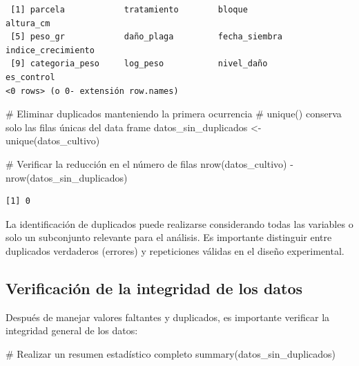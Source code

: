 \documentclass[
  spanish,
  a4paper,
  DIV=11,
  numbers=noendperiod,
  onepage,
  openany]{scrreprt}
\newenvironment{Shaded}{\begin{snugshade}}{\end{snugshade}}
\newcommand{\CommentTok}[1]{\textcolor[rgb]{0.37,0.37,0.37}{#1}}
\newcommand{\FunctionTok}[1]{\textcolor[rgb]{0.28,0.35,0.67}{#1}}
\newcommand{\NormalTok}[1]{\textcolor[rgb]{0.00,0.23,0.31}{#1}}
\newcommand{\OtherTok}[1]{\textcolor[rgb]{0.00,0.23,0.31}{#1}}
\newcommand{\SpecialCharTok}[1]{\textcolor[rgb]{0.37,0.37,0.37}{#1}}
\begin{document}
\begin{verbatim}
 [1] parcela            tratamiento        bloque             altura_cm         
 [5] peso_gr            daño_plaga         fecha_siembra      indice_crecimiento
 [9] categoria_peso     log_peso           nivel_daño         es_control        
<0 rows> (o 0- extensión row.names)
\end{verbatim}

\begin{Shaded}
\begin{Highlighting}[]
\CommentTok{\# Eliminar duplicados manteniendo la primera ocurrencia}
\CommentTok{\# unique() conserva solo las filas únicas del data frame}
\NormalTok{datos\_sin\_duplicados }\OtherTok{\textless{}{-}} \FunctionTok{unique}\NormalTok{(datos\_cultivo)}

\CommentTok{\# Verificar la reducción en el número de filas}
\FunctionTok{nrow}\NormalTok{(datos\_cultivo) }\SpecialCharTok{{-}} \FunctionTok{nrow}\NormalTok{(datos\_sin\_duplicados)}
\end{Highlighting}
\end{Shaded}

\begin{verbatim}
[1] 0
\end{verbatim}

La identificación de duplicados puede realizarse considerando todas las
variables o solo un subconjunto relevante para el análisis. Es
importante distinguir entre duplicados verdaderos (errores) y
repeticiones válidas en el diseño experimental.

\subsection{Verificación de la integridad de los
datos}\label{verificaciuxf3n-de-la-integridad-de-los-datos}

Después de manejar valores faltantes y duplicados, es importante
verificar la integridad general de los datos:

\begin{Shaded}
\begin{Highlighting}[]
\CommentTok{\# Realizar un resumen estadístico completo}
\FunctionTok{summary}\NormalTok{(datos\_sin\_duplicados)}
\end{Highlighting}
\end{Shaded}
\end{document}

